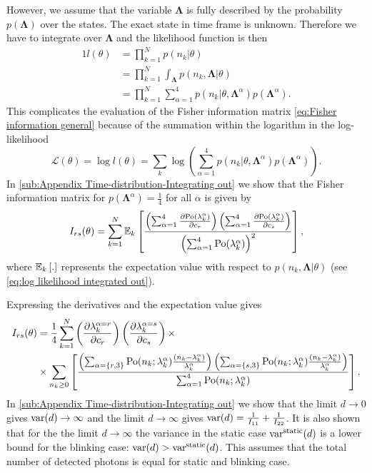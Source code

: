 However, we assume that the variable $\bm{\Lambda}$ is fully described by the probability $p(\bm{\Lambda})$ over the states. The exact state in time frame is unknown. Therefore we have to integrate over $\bm{\Lambda}$ and the likelihood function is then
%
\begin{alignat}{1}
	l(\theta)
	&=\prod_{k=1}^Np(n_k|\theta)\nonumber\\
	&=\prod_{k=1}^N\int_{\bm{\Lambda}}p(n_k,\bm{\Lambda}|\theta)\nonumber\\
	&=\prod_{k=1}^N\sum_{\alpha=1}^4p(n_k|\theta,\bm{\Lambda}^\alpha)p(\bm{\Lambda}^\alpha).
	\label{eq:FREM likelihood Lanbda integrated out}
\end{alignat}
%
This complicates the evaluation of the Fisher information matrix \autoref{eq:Fisher information general} because of the summation within the logarithm in the log-likelihood
%
\begin{equation}
	\mathcal{L}(\theta)=\log l(\theta)=\sum_k\log\left(\sum_{\alpha=1}^4p(n_k|\theta,\bm{\Lambda}^\alpha)p(\bm{\Lambda}^\alpha)\right).
	\label{eq:log likelihood integrated out}
\end{equation}
%
In \autoref{sub:Appendix Time-distribution-Integrating out} we show that the Fisher information matrix for $p(\bm{\Lambda}^\alpha)=\frac{1}{4}$ for all $\alpha$ is given by
%
\begin{equation}
	I_{rs}(\theta) =\sum_{k=1}^N\mathbb{E}_k\left[\frac{\left(\sum_{\alpha=1}^4\frac{\partial\mathrm{Po}(\lambda_k^\alpha)}{\partial c_r}\right)\left(\sum_{\alpha=1}^4\frac{\partial\mathrm{Po}(\lambda_k^\alpha)}{\partial c_s}\right)}{\left(\sum_{\alpha=1}^4\mathrm{Po}(\lambda_k^\alpha)\right)^2}\right],
	\label{eq:Fisher Information Blinking Integrating Out}
\end{equation}
%
where $\mathbb{E}_k\left[.\right]$ represents the expectation value with respect to $p(n_k,\bm{\Lambda}|\theta)$ (see \autoref{eq:log likelihood integrated out}). 

Expressing the derivatives and the expectation value gives
%
\begin{alignat}{2}
	I_{rs}(\theta)&=\frac{1}{4}\sum_{k=1}^N\left(\frac{\partial\lambda_k^{\alpha=r}}{\partial c_r}\right)\left(\frac{\partial\lambda_k^{\alpha=s}}{\partial c_s}\right)\times \nonumber\\
	&\times \sum_{n_k\geq0}\left[\frac{\left(\sum_{\alpha=\{r,3\}}\mathrm{Po}(n_k;\lambda_k^\alpha)\frac{(n_k-\lambda_k^\alpha)}{\lambda_k^\alpha}\right)\left(\sum_{\alpha=\{s,3\}}\mathrm{Po}(n_k;\lambda_k^\alpha)\frac{(n_k-\lambda_k^\alpha)}{\lambda_k^\alpha}\right)}{\sum_{\alpha=1}^4\mathrm{Po}(n_k;\lambda_k^\alpha)}\right].
	\label{eq:FI-blinking}
\end{alignat}
%
In \autoref{sub:Appendix Time-distribution-Integrating out} we show that the limit $d\rightarrow0$ gives $\mathrm{var}(d)\rightarrow\infty$ and the limit $d\rightarrow\infty$ gives $\mathrm{var}(d)=\frac{1}{I_{11}}+\frac{1}{I_{22}}$. It is also shown that for the the limit $d\rightarrow\infty$ the variance in the static case $\mathrm{var}^{\text{static}}(d)$ is a lower bound for the blinking case: $\mathrm{var}(d)>\mathrm{var}^{\text{static}}(d)$. This assumes that the total number of detected photons is equal for static and blinking case. 


